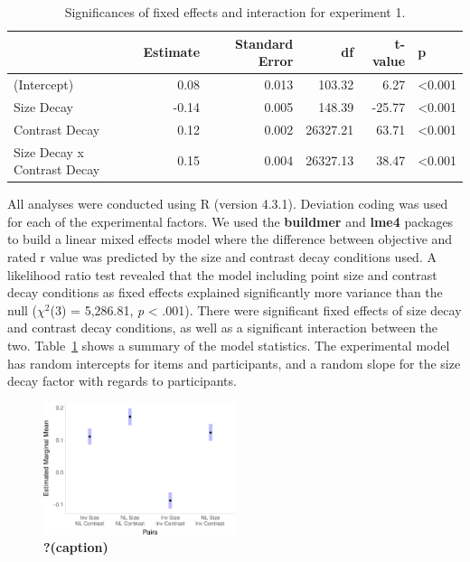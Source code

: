\documentclass[manuscript, review, anonymous, screen]{acmart}
\begin{document}
\hypertarget{tbl-sig}{}
\begin{table}
\caption{\label{tbl-sig}Significances of fixed effects and interaction for experiment 1. }\tabularnewline

\centering
\begin{tabular}{lrrrrl}
\toprule
  & Estimate & Standard Error & df & t-value & p\\
\midrule
(Intercept) & 0.08 & 0.013 & 103.32 & 6.27 & <0.001\\
Size Decay & -0.14 & 0.005 & 148.39 & -25.77 & <0.001\\
Contrast Decay & 0.12 & 0.002 & 26327.21 & 63.71 & <0.001\\
Size Decay x Contrast Decay & 0.15 & 0.004 & 26327.13 & 38.47 & <0.001\\
\bottomrule
\end{tabular}
\end{table}

All analyses were conducted using R (version 4.3.1). Deviation coding
was used for each of the experimental factors. We used the
\textbf{buildmer} and \textbf{lme4} packages to build a linear mixed
effects model where the difference between objective and rated r value
was predicted by the size and contrast decay conditions used. A
likelihood ratio test revealed that the model including point size and
contrast decay conditions as fixed effects explained significantly more
variance than the null (\(\chi^2\)(3) = 5,286.81, \emph{p} \textless{}
.001). There were significant fixed effects of size decay and contrast
decay conditions, as well as a significant interaction between the two.
Table~\ref{tbl-sig} shows a summary of the model statistics. The
experimental model has random intercepts for items and participants, and
a random slope for the size decay factor with regards to participants.

\begin{figure}

\includegraphics[width=0.5\textwidth,height=\textheight]{size_and_contrast_new_files/figure-pdf/fig-emm-plot-1.pdf} \hfill{}

\caption{\label{fig-emm-plot}\textbf{?(caption)}}

\end{figure}
\end{document}
